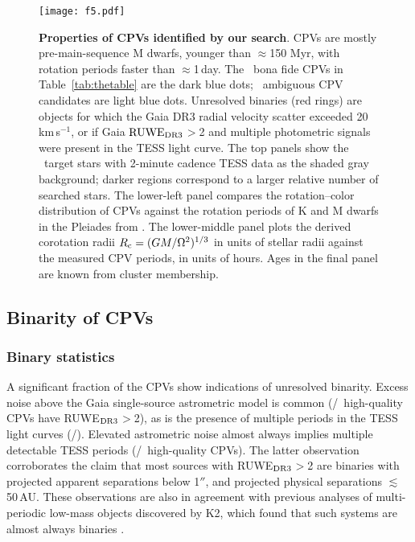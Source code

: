 \documentclass[11pt,twocolumn,tighten]{aastex63}
\newcommand{\kms}{{km\,s$^{-1}$}}
\begin{document}
\begin{figure*}[!t]
	\begin{center}
		\centering
		\texttt{[image: f5.pdf]}
		\vspace{-0.1cm}
		\caption{
			{\bf Properties of CPVs identified by our search}.
      CPVs are mostly pre-main-sequence M dwarfs, younger than
      $\approx$150 Myr, with rotation periods faster than
      $\approx$1\,day.  The \ngoods\ bona fide CPVs in
      Table~\ref{tab:thetable} are the dark blue dots; \nmaybes\
      ambiguous CPV candidates are light blue dots.  Unresolved
      binaries (red rings) are objects for which the Gaia DR3 radial
      velocity scatter exceeded 20\,\kms, or if Gaia ${\rm RUWE}_{\rm
      DR3}$$>$2 and multiple photometric signals were present in the
      TESS light curve.  The top panels show the \nstarssearched\
      target stars with 2-minute cadence TESS data as the shaded gray
      background; darker regions correspond to a larger relative
      number of searched stars.  The lower-left panel compares the
      rotation--color distribution of CPVs against the rotation
      periods of K and M dwarfs in the Pleiades from
      \citet{2016AJ....152..114R}.  The lower-middle panel plots the
      derived corotation radii $R_{\rm c} = (GM/\Omega^2)^{1/3}$ in
      units of stellar radii against the measured CPV periods, in
      units of hours.  Ages in the final panel are known from cluster
      membership.
		}
		\label{fig:catalogscatter}
	\end{center}
\end{figure*}



\subsection{Binarity of CPVs}
\label{subsec:resultsbinarity}

\subsubsection{Binary statistics}

A significant fraction of the CPVs show indications of unresolved
binarity.  Excess noise above the Gaia single-source astrometric model
is common (\ngoodhighruwe/\ngoods\ high-quality CPVs have RUWE$_{\rm
DR3}$$>$2), as is the presence of multiple periods in the TESS light
curves (\ngoodmultperiodflag/\ngoods).  Elevated astrometric noise
almost always implies multiple detectable TESS periods
(\ngoodruweandmultperiod/\ngoodhighruwe\ high-quality CPVs).  The
latter observation corroborates the claim that most sources with
RUWE$_{\rm DR3}$$>$2 are binaries with projected apparent separations
below 1$''$, and projected physical separations $\lesssim$50\,AU.
These observations are also in agreement with previous analyses of
multi-periodic low-mass objects discovered by K2, which found that
such systems are almost always binaries
\citep{2018AJ....156..138T,2018AJ....156..275S}.
\end{document}
